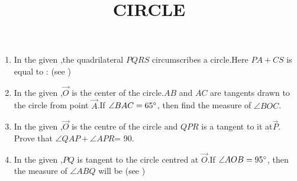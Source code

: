 \documentclass[12pt,A4 paper]{article}
\begin{document}
\title{\textbf{CIRCLE}}
\date{}
\maketitle

\begin{enumerate}
	\item In the given ,the quadrilateral $PQRS$ circumscribes a circle.Here $PA+CS$ is equal to : (see ) 

\begin{figure}[H]
	        \centering
		
		\caption{}
		\label{fig:fig:1}
\end{figure}



 \begin{table}[!ht]
	        \centering
	        
		\caption{}
		\label{tab:tab:1}
 \end{table}




\item In the given ,$\vec{O}$ is the center of the circle.$AB$ and $AC$ are tangents drawn to the circle from point $\vec{ A}$.If $\angle BAC=65\degree$, then find the measure of $\angle BOC$.


	\begin{center}
\begin{figure}[H]
	        \centering
	        
		\caption{}
		\label{fig:fig:2}
        \end{figure}
	\end{center}




\item In the given ,$\vec{ O}$ is the centre of the circle and $QPR$ is a tangent to it at$\vec{ P}$. Prove that $\angle QAP+ \angle APR$= 90\degree.
\begin{figure}[H]
	        \centering
	        
		\caption{}
		\label{fig:fig:3}

        \end{figure}





\item In the given ,$PQ$ is tangent to the circle centred at $\vec{ O}$.If $\angle AOB= 95\degree$, then the measure of $\angle ABQ$ will be (see )
\begin{figure}[H]
	        \centering
	        
		\caption{}
		\label{fig:fig:4}
        \end{figure}



\end{enumerate}
\end{document}
